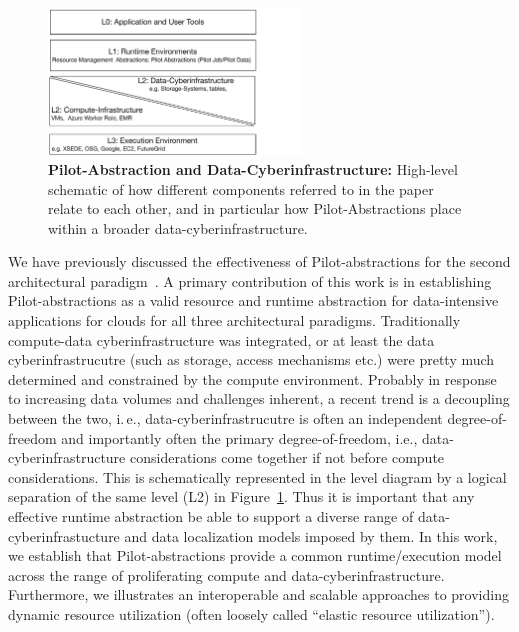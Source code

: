 \documentclass[times]{cpeauth}
\newcommand{\pilot}{Pilot\xspace}
\begin{document}
\begin{figure}[t] 
\centering
\includegraphics[width=0.6\textwidth]{figures/data-intensive-arch.pdf}
\caption{\textbf{\pilot-Abstraction and Data-Cyberinfrastructure:} High-level schematic of how different components referred to
  in the paper relate to each other, and in particular how
  \pilot-Abstractions place within a broader data-cyberinfrastructure.}
\label{fig:figures_arch}
\end{figure}

We have previously discussed the effectiveness of Pilot-abstractions
for the second architectural paradigm~\cite{pstar12}.  A primary contribution
of this work is in establishing \pilot-abstractions as a valid
resource and runtime abstraction for data-intensive applications for
clouds for all three architectural paradigms.  Traditionally
compute-data cyberinfrastructure was integrated, or at least the data
cyberinfrastrucutre (such as storage, access mechanisms etc.)  were
pretty much determined and constrained by the compute environment.
Probably in response to increasing data volumes and challenges
inherent, a recent trend is a decoupling between the two, i.\,e.,
data-cyberinfrastrucutre is often an independent degree-of-freedom and
importantly often the primary degree-of-freedom, i.e.,
data-cyberinfrastructure considerations come together if not before
compute considerations.  This is schematically represented in the
level diagram by a logical separation of the same level (L2) in
Figure~\ref{fig:figures_arch}.  Thus it is important that any
effective runtime abstraction be able to support a diverse range of
data-cyberinfrastucture and data localization models imposed by them.
In this work, we establish that \pilot-abstractions provide a common
runtime/execution model across the range of proliferating compute and
data-cyberinfrastructure.  Furthermore, we illustrates an
interoperable and scalable approaches to providing dynamic resource
utilization (often loosely called ``elastic resource utilization'').
\end{document}
